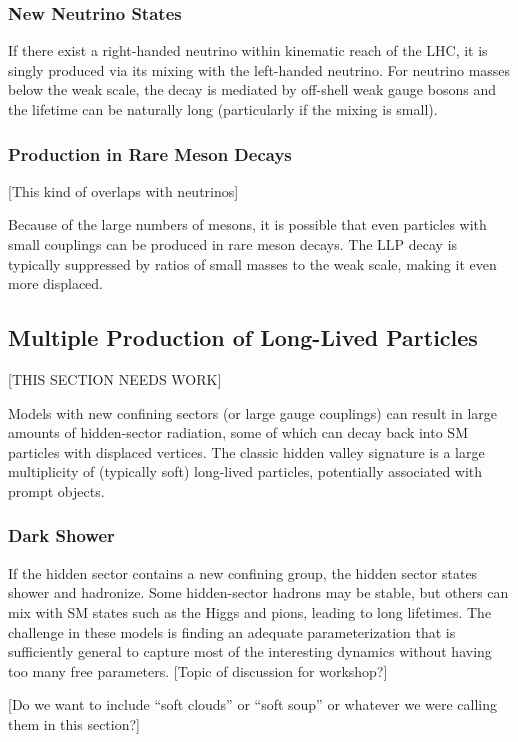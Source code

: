\subsubsection{New Neutrino States}
If there exist a right-handed neutrino within kinematic reach of the LHC, it is singly produced via its mixing with the left-handed neutrino. For neutrino masses below the weak scale, the decay is mediated by off-shell weak gauge bosons and the lifetime can be naturally long (particularly if the mixing is small).

\subsubsection{Production in Rare Meson Decays}
[This kind of overlaps with neutrinos]

Because of the large numbers of mesons, it is possible that even particles with small couplings can be produced in rare meson decays. The LLP decay is typically suppressed by ratios of small masses to the weak scale, making it even more displaced.

\subsection{Multiple Production of Long-Lived Particles}

[THIS SECTION NEEDS WORK]

Models with new confining sectors (or large gauge couplings) can result in large amounts of hidden-sector radiation, some of which can decay back into SM particles with displaced vertices. The classic hidden valley signature is a large multiplicity of (typically soft) long-lived particles, potentially associated with prompt objects.

\subsubsection{Dark Shower}
If the hidden sector contains a new confining group, the hidden sector states shower and hadronize. Some hidden-sector hadrons may be stable, but others can mix with SM states such as the Higgs and pions, leading to long lifetimes. The challenge in these models is finding an adequate parameterization that is sufficiently general to capture most of the interesting dynamics without having too many free parameters. [Topic of discussion for workshop?]


[Do we want to include ``soft clouds'' or ``soft soup'' or whatever we were calling them in this section?]

